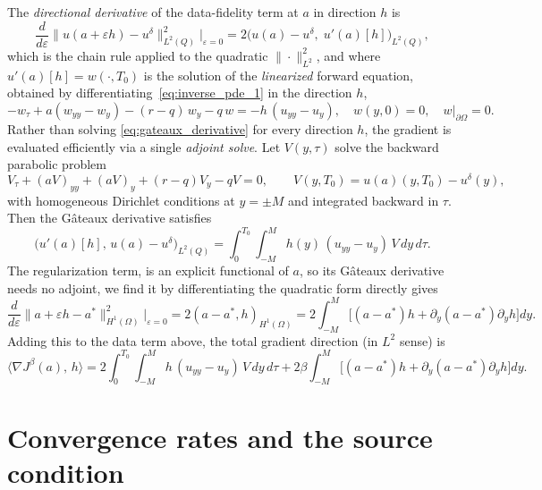 The \emph{directional derivative} of the data-fidelity term at $a$ in direction $h$ is
\begin{equation*}
    \frac{d}{d\varepsilon}\|u(a+\varepsilon h) - u^\delta\|^2_{L^2(Q)}\Big|_{\varepsilon=0}
    = 2\bigl(u(a) - u^\delta,\; u'(a)[h]\bigr)_{L^2(Q)},
\end{equation*}
which is the chain rule applied to the quadratic $\|\cdot\|^2_{L^2}$,
and where $u'(a)[h] = w(\cdot, T_0)$ is the solution of the \emph{linearized} forward equation,
obtained by differentiating~\eqref{eq:inverse_pde_1} in the direction $h$,
\begin{equation}\label{eq:gateaux_derivative}
    -w_\tau + a(w_{yy} - w_y) - (r-q)\,w_y - q\,w = -h\,(u_{yy} - u_y),
    \quad w(y,0)=0, \quad w\big|_{\partial\Omega}=0.
\end{equation}
Rather than solving \eqref{eq:gateaux_derivative} for every direction $h$,
the gradient is evaluated efficiently via a single \emph{adjoint solve}.
Let $V(y,\tau)$ solve the backward parabolic problem
\begin{equation}\label{eq:adjoint_pde}
    V_\tau + (aV)_{yy} + (aV)_y + (r-q)V_y - qV = 0,
    \qquad V(y, T_0) = u(a)(y, T_0) - u^\delta(y),
\end{equation}
with homogeneous Dirichlet conditions at $y = \pm M$ and integrated backward in $\tau$.
Then the Gâteaux derivative satisfies \cite{egger2005tikhonov}
\begin{equation*}
    \bigl(u'(a)[h],\, u(a)-u^\delta\bigr)_{L^2(Q)}
    = \int_0^{T_0}\!\!\int_{-M}^{M} h(y)\,(u_{yy}-u_y)\,V\,dy\,d\tau.
\end{equation*}
The regularization term, is an explicit functional of $a$,
so its Gâteaux derivative needs no adjoint,
we find it by differentiating the quadratic form directly gives
\begin{equation*}
    \frac{d}{d\varepsilon}\|a+\varepsilon h - a^*\|^2_{H^1(\Omega)}\Big|_{\varepsilon=0}
    = 2(a-a^*,h)_{H^1(\Omega)}
    = 2\int_{-M}^{M}\bigl[(a-a^*)h + \partial_y(a-a^*)\partial_y h\bigr]dy.
\end{equation*}
Adding this to the data term above, the total gradient direction (in $L^2$ sense) is
\begin{equation}\label{eq:tikhonov_gradient}
    \langle \nabla J^\beta(a),\, h \rangle
    = 2\int_0^{T_0}\!\!\int_{-M}^{M} h\,(u_{yy}-u_y)\,V\,dy\,d\tau
      + 2\beta\int_{-M}^{M}\bigl[(a-a^*)h + \partial_y(a-a^*)\partial_y h\bigr]dy.
\end{equation}
\section{Convergence rates and the source condition}\label{sec:convergence_rates}

